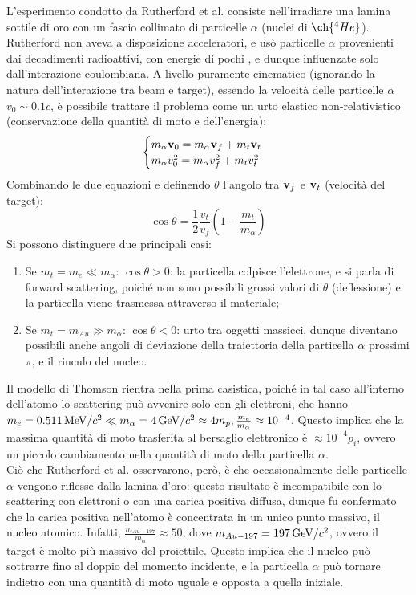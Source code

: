 L'esperimento condotto da Rutherford et al. consiste nell'irradiare una lamina sottile di oro con un fascio collimato di particelle $ \alpha $ (nuclei di $ \ch{^{4} He} $). Rutherford non aveva a disposizione acceleratori, e usò particelle $\alpha$ provenienti dai decadimenti radioattivi, con energie di pochi \mev, e dunque influenzate solo dall'interazione coulombiana. A livello puramente cinematico (ignorando la natura dell'interazione tra beam e target), essendo la velocità delle particelle $ \alpha $ $ v_0 \sim 0.1c $, è possibile trattare il problema come un urto elastico non-relativistico (conservazione della quantità di moto e dell'energia):
\begin{equation}
	\begin{cases}
	  m_{\alpha} \mathbf{v}_0 = m_{\alpha} \mathbf{v}_f + m_t \mathbf{v}_t \\
	  m_{\alpha} v_0^2 = m_{\alpha} v_f^2 + m_t v_t^2 \\
	\end{cases}
	\label{eq:2}
\end{equation}
Combinando le due equazioni e definendo $ \theta $ l'angolo tra $ \mathbf{v}_f $ e $ \mathbf{v}_t $ (velocità del target):
\begin{equation}
	\cos \theta = \frac{1}{2} \frac{v_t}{v_f} \left(1 - \frac{m_t}{m_{\alpha}}\right)
	\label{eq:3}
\end{equation}
Si possono distinguere due principali casi:
\begin{enumerate}
	\item Se $ m_t = m_e \ll m_{\alpha} $: $ \cos \theta > 0 $: la particella colpisce l'elettrone, e si parla di forward scattering, poiché non sono possibili grossi valori di $ \theta $ (deflessione) e la particella viene trasmessa attraverso il materiale;
	\item Se $ m_t = m_{Au} \gg m_{\alpha} $: $ \cos \theta < 0 $: urto tra oggetti massicci, dunque diventano possibili anche angoli di deviazione della traiettoria della particella $\alpha$ prossimi $ \pi $, e il rinculo del nucleo.
\end{enumerate}
Il modello di Thomson rientra nella prima casistica, poiché in tal caso all'interno dell'atomo lo scattering può avvenire solo con gli elettroni, che hanno $ m_e = 0.511 \,\text{MeV}/c^2 \ll m_{\alpha} = 4 \,\text{GeV}/c^2 \approx 4m_p , \frac{m_e}{m_{\alpha}} \approx 10^{-4} $. Questo implica che la massima quantità di moto trasferita al bersaglio elettronico è $\approx 10^{-4} p_i$, ovvero un piccolo cambiamento nella quantità di moto della particella $\alpha$.\\
Ciò che Rutherford et al. osservarono, però, è che occasionalmente delle particelle $ \alpha $ vengono riflesse dalla lamina d'oro: questo risultato è incompatibile con lo scattering con elettroni o con una carica positiva diffusa, dunque fu confermato che la carica positiva nell'atomo è concentrata in un unico punto massivo, il nucleo atomico. Infatti, $\frac{m_{Au-197}}{m_{\alpha}}\approx 50$, dove $m_{Au-197}=197 \,\text{GeV}/c^2$, ovvero il target è molto più massivo del proiettile. Questo implica che il nucleo può sottrarre fino al doppio del momento incidente, e la particella $\alpha$ può tornare indietro con una quantità di moto uguale e opposta a quella iniziale.

